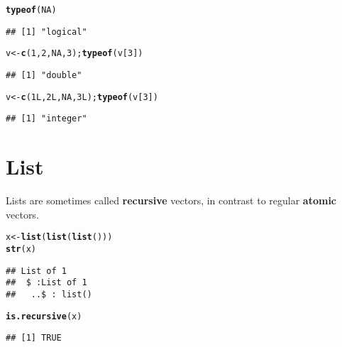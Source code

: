 \documentclass{article}\usepackage[]{graphicx}\usepackage[]{color}
\makeatletter
\newcommand{\hlnum}[1]{\textcolor[rgb]{0.686,0.059,0.569}{#1}}%
\newcommand{\hlstd}[1]{\textcolor[rgb]{0.345,0.345,0.345}{#1}}%
\newcommand{\hlkwb}[1]{\textcolor[rgb]{0.69,0.353,0.396}{#1}}%
\newcommand{\hlkwd}[1]{\textcolor[rgb]{0.737,0.353,0.396}{\textbf{#1}}}%
\newenvironment{kframe}{%
 \def\at@end@of@kframe{}%
 \ifinner\ifhmode%
  \def\at@end@of@kframe{\end{minipage}}%
  \begin{minipage}{\columnwidth}%
 \fi\fi%
 \def\FrameCommand##1{\hskip\@totalleftmargin \hskip-\fboxsep
 \colorbox{shadecolor}{##1}\hskip-\fboxsep
     \hskip-\linewidth \hskip-\@totalleftmargin \hskip\columnwidth}%
 \MakeFramed {\advance\hsize-\width
   \@totalleftmargin\z@ \linewidth\hsize
   \@setminipage}}%
 {\par\unskip\endMakeFramed%
 \at@end@of@kframe}
\newenvironment{knitrout}{}{} %
\makeatother
\begin{document}
\begin{knitrout}
\color{fgcolor}\begin{kframe}
\begin{alltt}
\hlkwd{typeof}\hlstd{(}\hlnum{NA}\hlstd{)}
\end{alltt}
\begin{verbatim}
## [1] "logical"
\end{verbatim}
\begin{alltt}
\hlstd{v} \hlkwb{<-} \hlkwd{c}\hlstd{(}\hlnum{1}\hlstd{,} \hlnum{2}\hlstd{,} \hlnum{NA}\hlstd{,} \hlnum{3}\hlstd{);} \hlkwd{typeof}\hlstd{(v[}\hlnum{3}\hlstd{])}
\end{alltt}
\begin{verbatim}
## [1] "double"
\end{verbatim}
\begin{alltt}
\hlstd{v} \hlkwb{<-} \hlkwd{c}\hlstd{(}\hlnum{1L}\hlstd{,} \hlnum{2L}\hlstd{,} \hlnum{NA}\hlstd{,} \hlnum{3L}\hlstd{);} \hlkwd{typeof}\hlstd{(v[}\hlnum{3}\hlstd{])}
\end{alltt}
\begin{verbatim}
## [1] "integer"
\end{verbatim}
\end{kframe}
\end{knitrout}

\section{List}

Lists are sometimes called \textbf{recursive} vectors, in contrast to regular \textbf{atomic} vectors.

\begin{knitrout}
\color{fgcolor}\begin{kframe}
\begin{alltt}
\hlstd{x} \hlkwb{<-} \hlkwd{list}\hlstd{(}\hlkwd{list}\hlstd{(}\hlkwd{list}\hlstd{()))}
\hlkwd{str}\hlstd{(x)}
\end{alltt}
\begin{verbatim}
## List of 1
##  $ :List of 1
##   ..$ : list()
\end{verbatim}
\begin{alltt}
\hlkwd{is.recursive}\hlstd{(x)}
\end{alltt}
\begin{verbatim}
## [1] TRUE
\end{verbatim}
\end{kframe}
\end{knitrout}
\end{document}
